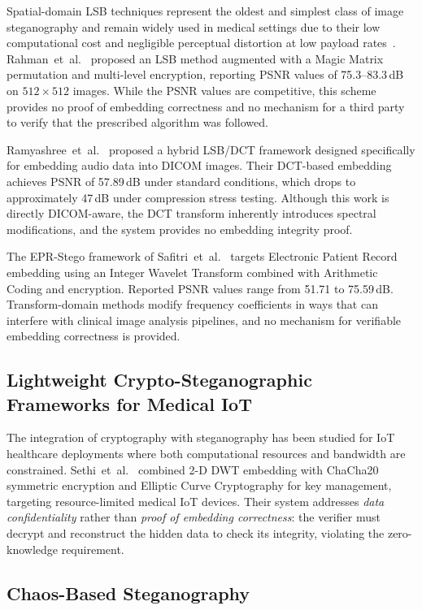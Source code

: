 \documentclass{jstarticle}
\begin{document}
Spatial-domain LSB techniques represent the oldest and simplest class of image steganography and remain widely used in medical settings due to their low computational cost and negligible perceptual distortion at low payload rates~\cite{b15}.
Rahman~et~al.~\cite{b13} proposed an LSB method augmented with a Magic Matrix permutation and multi-level encryption, reporting PSNR values of 75.3--83.3\,dB on $512\times512$ images.
While the PSNR values are competitive, this scheme provides no proof of embedding correctness and no mechanism for a third party to verify that the prescribed algorithm was followed.

Ramyashree~et~al.~\cite{b10} proposed a hybrid LSB/DCT framework designed specifically for embedding audio data into DICOM images.
Their DCT-based embedding achieves PSNR of 57.89\,dB under standard conditions, which drops to approximately 47\,dB under compression stress testing.
Although this work is directly DICOM-aware, the DCT transform inherently introduces spectral modifications, and the system provides no embedding integrity proof.

The EPR-Stego framework of Safitri~et~al.~\cite{b12} targets Electronic Patient Record embedding using an Integer Wavelet Transform combined with Arithmetic Coding and encryption.
Reported PSNR values range from 51.71 to 75.59\,dB.
Transform-domain methods modify frequency coefficients in ways that can interfere with clinical image analysis pipelines, and no mechanism for verifiable embedding correctness is provided.

\subsection{Lightweight Crypto-Steganographic Frameworks for Medical IoT}

The integration of cryptography with steganography has been studied for IoT healthcare deployments where both computational resources and bandwidth are constrained.
Sethi~et~al.~\cite{b11} combined 2-D DWT embedding with ChaCha20 symmetric encryption and Elliptic Curve Cryptography for key management, targeting resource-limited medical IoT devices.
Their system addresses \emph{data confidentiality} rather than \emph{proof of embedding correctness}: the verifier must decrypt and reconstruct the hidden data to check its integrity, violating the zero-knowledge requirement.

\subsection{Chaos-Based Steganography}
\end{document}
